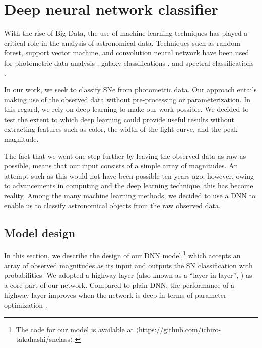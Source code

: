 \documentclass[useamsfonts]{pasj01}
\begin{document}
\section{Deep neural network classifier}
\label{sec:DNN}
With the rise of Big Data, the use of machine learning techniques has played a critical role in the analysis of astronomical data. Techniques such as random forest, support vector machine, and convolution neural network have been used for photometric data analysis \citep{pasquet19a}, galaxy classifications \citep{hausen19a}, and spectral classifications \citep{garciadias18a,muthukrishna19c,sharma20a}.

In our work, we seek to classify SNe from photometric data.
Our approach entails making use of the observed data without pre-processing or parameterization.
In this regard, we rely on deep learning to make our work possible.
We decided to test the extent to which deep learning could provide useful results without extracting features such as color, the width of the light curve, and the peak magnitude.

The fact that we went one step further by leaving the observed data as raw as possible, means that our input consists of a simple array of magnitudes. 
An attempt such as this would not have been possible ten years ago; however, owing to advancements in computing and the deep learning technique, this has become reality. 
Among the many machine learning methods, we decided to use a DNN to enable us to classify astronomical objects from the raw observed data.

\subsection{Model design}
\label{sec:model} %
In this section, we describe the design of our DNN model,\footnote{The code for our model is available at $\langle$https://github.com/ichiro-takahashi/snclass$\rangle$.} 
which accepts an array of observed magnitudes as its input and outputs the SN classification with probabilities. We adopted a highway layer (also known as a ``layer in layer'', \cite{srivastava15a}) as a core part of our network. Compared to plain DNN, the performance of a highway layer improves when the network is deep in terms of parameter optimization \citep{srivastava15b}.   
\end{document}
